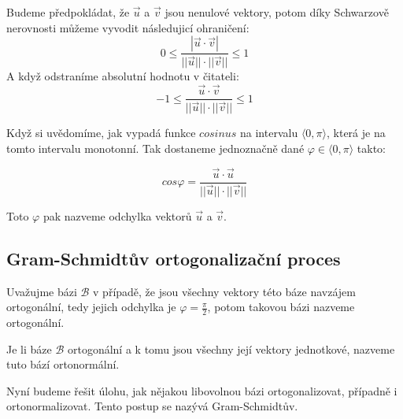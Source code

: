 Budeme předpokládat, že $\vec{u}$ a $\vec{v}$ jsou nenulové
vektory, potom díky Schwarzově nerovnosti můžeme vyvodit
následujicí ohraničení:
$$0 \leq \frac{|\vec{u} \cdot \vec{v}|}
{||\vec{u}|| \cdot||\vec{v}||} \leq 1$$
A když odstraníme absolutní hodnotu v čitateli:
$$-1 \leq \frac{\vec{u} \cdot \vec{v}}
{||\vec{u}|| \cdot||\vec{v}||} \leq 1$$

Když si uvědomíme, jak vypadá funkce $cosinus$ na
intervalu $\langle0, \pi \rangle$, která je na tomto
intervalu monotonní. Tak dostaneme jednoznačně dané $\varphi \in \langle 0,
\pi \rangle$ takto:

$$cos \varphi = \frac{\vec{u} \cdot
\vec{u}}{||\vec{u}|| \cdot ||\vec{v}||}$$

Toto $\varphi$ pak nazveme odchylka vektorů $\vec{u}$ a $\vec{v}$.

\subsection{Gram-Schmidtův ortogonalizační proces}

\begin{definition}
    Uvažujme bázi $\mathcal{B}$ v případě, že jsou všechny vektory této
    báze navzájem ortogonální, tedy jejich odchylka je $\varphi = \frac{\pi}{2}$,
    potom takovou bázi nazveme ortogonální.
\end{definition}

\begin{definition}
    Je li báze $\mathcal{B}$ ortogonální a k tomu jsou všechny
    její vektory jednotkové, nazveme tuto bází ortonormální.
\end{definition}

Nyní budeme řešit úlohu, jak nějakou libovolnou bázi ortogonalizovat,
případně i ortonormalizovat. Tento postup se nazývá Gram-Schmidtův.

